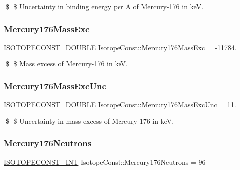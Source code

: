 \$ \$ Uncertainty in binding energy per A of Mercury-\/176 in keV. \mbox{\label{group___isotope_const-_mercury-_hg176_ga57501bceec8976546a79ecaa3c401028}} 
\subsubsection{\texorpdfstring{Mercury176\+Mass\+Exc}{Mercury176MassExc}}
{\footnotesize\ttfamily \mbox{\hyperlink{group___isotope_const-_macros_ga8f45a7272ce02c0b4c65c44636ed719a}{I\+S\+O\+T\+O\+P\+E\+C\+O\+N\+S\+T\+\_\+\+D\+O\+U\+B\+LE}} Isotope\+Const\+::\+Mercury176\+Mass\+Exc = -\/11784.}

\$ \$ Mass excess of Mercury-\/176 in keV. \mbox{\label{group___isotope_const-_mercury-_hg176_ga4f49969b84cae6fd90a1d1ab1a5d3359}} 
\subsubsection{\texorpdfstring{Mercury176\+Mass\+Exc\+Unc}{Mercury176MassExcUnc}}
{\footnotesize\ttfamily \mbox{\hyperlink{group___isotope_const-_macros_ga8f45a7272ce02c0b4c65c44636ed719a}{I\+S\+O\+T\+O\+P\+E\+C\+O\+N\+S\+T\+\_\+\+D\+O\+U\+B\+LE}} Isotope\+Const\+::\+Mercury176\+Mass\+Exc\+Unc = 11.}

\$ \$ Uncertainty in mass excess of Mercury-\/176 in keV. \mbox{\label{group___isotope_const-_mercury-_hg176_ga3af9affefbf23a54fa60c1fd41350b89}} 
\subsubsection{\texorpdfstring{Mercury176\+Neutrons}{Mercury176Neutrons}}
{\footnotesize\ttfamily \mbox{\hyperlink{group___isotope_const-_macros_ga5f18360b3e99483a35c32d789e62621c}{I\+S\+O\+T\+O\+P\+E\+C\+O\+N\+S\+T\+\_\+\+I\+NT}} Isotope\+Const\+::\+Mercury176\+Neutrons = 96}

